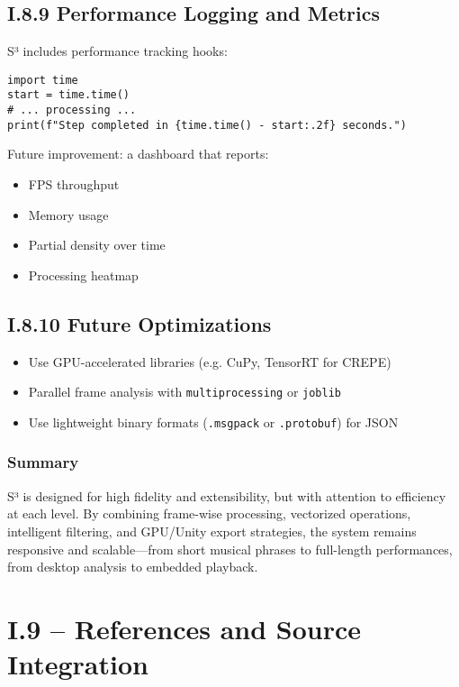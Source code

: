 \subsection*{I.8.9 Performance Logging and Metrics}

S³ includes performance tracking hooks:

\begin{verbatim}
import time
start = time.time()
# ... processing ...
print(f"Step completed in {time.time() - start:.2f} seconds.")
\end{verbatim}

Future improvement: a dashboard that reports:

\begin{itemize}
    \item FPS throughput
    \item Memory usage
    \item Partial density over time
    \item Processing heatmap
\end{itemize}

\subsection*{I.8.10 Future Optimizations}

\begin{itemize}
    \item Use GPU-accelerated libraries (e.g. CuPy, TensorRT for CREPE)
    \item Parallel frame analysis with \texttt{multiprocessing} or \texttt{joblib}
    \item Use lightweight binary formats (\texttt{.msgpack} or \texttt{.protobuf}) for JSON
\end{itemize}

\subsubsection*{Summary}

S³ is designed for high fidelity and extensibility, but with attention to efficiency at each level. By combining frame-wise processing, vectorized operations, intelligent filtering, and GPU/Unity export strategies, the system remains responsive and scalable—from short musical phrases to full-length performances, from desktop analysis to embedded playback.

\section*{I.9 – References and Source Integration}

